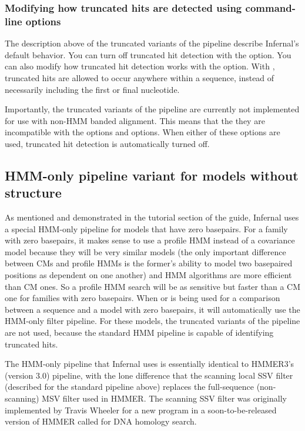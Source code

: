 
\subsubsection{Modifying how truncated hits are detected using
  command-line options}

The description above of the truncated variants of the pipeline
describe Infernal's default behavior. You can turn off truncated hit
detection with the  option. You can also modify how 
truncated hit detection works with the  option. With
, truncated hits are allowed to occur anywhere
within a sequence, instead of necessarily including the first or final
nucleotide. 

Importantly, the truncated variants of the pipeline are currently not
implemented for use with non-HMM banded alignment. This means that the
they are incompatible with the  options and
 options. When either of these options are used,
truncated hit detection is automatically turned off.

\subsection{HMM-only pipeline variant for models without structure}

As mentioned and demonstrated in the tutorial section of the guide,
Infernal uses a special HMM-only pipeline for models that have zero
basepairs. For a family with zero basepairs, it makes sense to use a
profile HMM instead of a covariance model because they will be very
similar models (the only important difference between CMs and profile
HMMs is the former's ability to model two basepaired positions as
dependent on one another) and HMM algorithms are more efficient than
CM ones. So a profile HMM search will be as sensitive but faster than
a CM one for families with zero basepairs.  When  or
 is being used for a comparison between a sequence and a
model with zero basepairs, it will automatically use the HMM-only
filter pipeline. For these models, the truncated variants of the
pipeline are not used, because the standard HMM pipeline is capable of
identifying truncated hits.

The HMM-only pipeline that Infernal uses is essentially identical to
HMMER3's (version 3.0) pipeline, with the lone
difference that the scanning local SSV filter (described for the
standard pipeline above) replaces the full-sequence (non-scanning) MSV
filter used in HMMER. The scanning SSV filter was originally
implemented by Travis Wheeler for a new program in a
soon-to-be-released version of HMMER called  for DNA
homology search.

